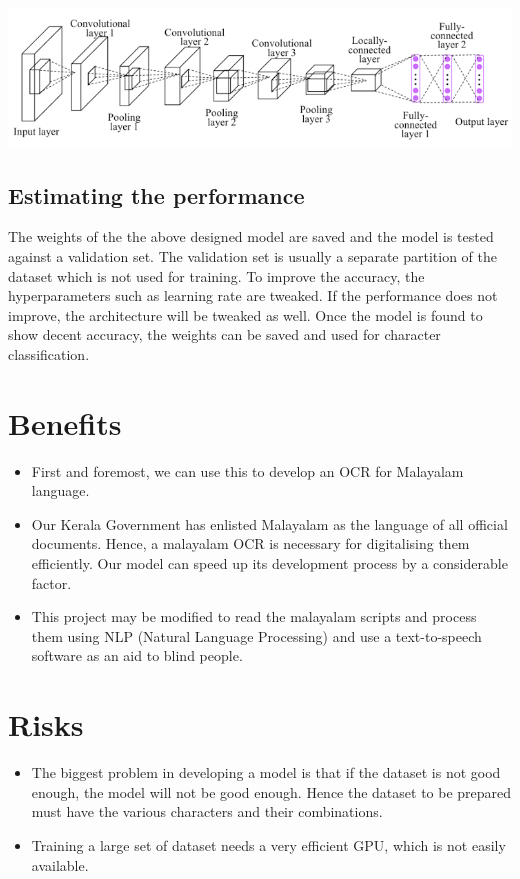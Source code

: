 \documentclass[12pt]{report}
\begin{document}
\includegraphics[width=\textwidth]{cnn.png}

\subsection*{Estimating the performance}
The weights of the the above designed model are saved and the model is tested against a validation set. The validation set is usually a separate partition of the dataset which is not used for training. To improve the accuracy, the hyperparameters such as learning rate are tweaked. If the performance does not improve, the architecture will be tweaked as well. Once the model is found to show decent accuracy, the weights can be saved and used for character classification. 

\section*{Benefits}
\begin{itemize}
\item First and foremost, we can use this to develop an OCR for Malayalam language.


\item Our Kerala Government has enlisted Malayalam as the language of all official documents. Hence, a malayalam OCR is necessary for digitalising them efficiently. Our model can speed up its development process by a considerable factor.
\item This project may be modified to read the malayalam scripts and process them using NLP (Natural Language Processing) and use a text-to-speech software as an aid to blind people.
\end{itemize}

\section*{Risks}
\begin{itemize}
\item The biggest problem in developing a model is that if the dataset is not good enough, the model will not be good enough. Hence the dataset to be prepared must have the various characters and their combinations.
\item Training a large set of dataset needs a very efficient GPU, which is not easily available.

\end{itemize}
\end{document}
